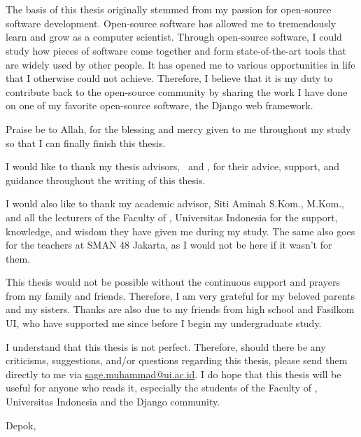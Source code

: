 \chapter*{\kataPengantar}

The basis of this thesis originally stemmed from my passion for open-source
software development. Open-source software has allowed me to tremendously
learn and grow as a computer scientist. Through open-source software, I could
study how pieces of software come together and form state-of-the-art tools that
are widely used by other people. It has opened me to various opportunities in
life that I otherwise could not achieve. Therefore, I believe that it is my
duty to contribute back to the open-source community by sharing the work I have
done on one of my favorite open-source software, the Django web framework.

Praise be to Allah, for the blessing and mercy given to me throughout my study
so that I can finally finish this thesis.

I would like to thank my thesis advisors, \pembimbingSatu\ and \pembimbingDua,
for their advice, support, and guidance throughout the writing of this thesis.

I would also like to thank my academic advisor, Siti Aminah S.Kom., M.Kom.,
and all the lecturers of the Faculty of \fakultas, Universitas Indonesia for
the support, knowledge, and wisdom they have given me during my study. The same
also goes for the teachers at SMAN 48 Jakarta, as I would not be here if it
wasn't for them.

This thesis would not be possible without the continuous support and prayers
from my family and friends. Therefore, I am very grateful for my beloved
parents and my sisters. Thanks are also due to my friends from high school and
Fasilkom UI, who have supported me since before I begin my undergraduate study.

I understand that this thesis is not perfect. Therefore, should there be any
criticisms, suggestions, and/or questions regarding this thesis, please send
them directly to me via
\href{mailto:sage.muhammad@ui.ac.id}{sage.muhammad@ui.ac.id}. I do hope that
this thesis will be useful for anyone who reads it, especially the students of
the Faculty of \fakultas, Universitas Indonesia and the Django community.

\vspace*{0.1cm}
\begin{flushright}
Depok, \tanggalSiapSidang\\[0.1cm]
\vspace*{1cm}
\penulis

\end{flushright}
